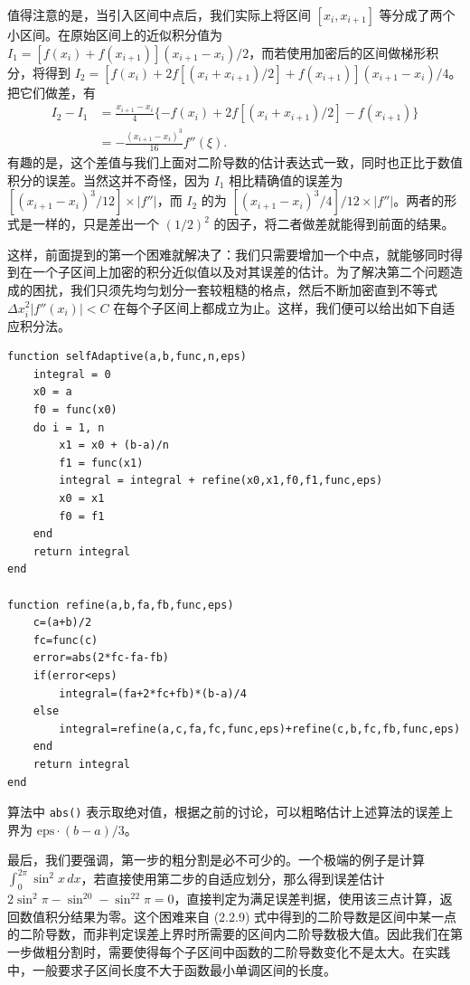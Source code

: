 值得注意的是，当引入区间中点后，我们实际上将区间 $[x_i,x_{i+1}]$ 等分成了两个小区间。在原始区间上的近似积分值为 $I_1=[f(x_i)+f(x_{i+1})](x_{i+1}-x_i)/2$，而若使用加密后的区间做梯形积分，将得到 $I_2=[f(x_i)+2f[(x_i+x_{i+1})/2]+f(x_{i+1})](x_{i+1}-x_i)/4$。把它们做差，有
\begin{equation}
\begin{aligned}
I_2-I_1&=\frac{x_{i+1}-x_i}{4}\{-f(x_i)+2f[(x_i+x_{i+1})/2]-f(x_{i+1})\}\\
&=-\frac{(x_{i+1}-x_i)^3}{16}f''(\xi).
\end{aligned}
\tag{2.2.9}
\end{equation}
有趣的是，这个差值与我们上面对二阶导数的估计表达式一致，同时也正比于数值积分的误差。当然这并不奇怪，因为 $I_1$ 相比精确值的误差为 $[(x_{i+1}-x_i)^3/12]\times |f''|$，而 $I_2$ 的为 $[(x_{i+1}-x_i)^3/4]/12\times|f''|$。两者的形式是一样的，只是差出一个 $(1/2)^2$ 的因子，将二者做差就能得到前面的结果。

这样，前面提到的第一个困难就解决了：我们只需要增加一个中点，就能够同时得到在一个子区间上加密的积分近似值以及对其误差的估计。为了解决第二个问题造成的困扰，我们只须先均匀划分一套较粗糙的格点，然后不断加密直到不等式 $\Delta x_i^2|f''(x_i)|<C$ 在每个子区间上都成立为止。这样，我们便可以给出如下自适应积分法。

\begin{algorithmBox}
\begin{lstlisting}[style=bellacode]
function selfAdaptive(a,b,func,n,eps)
    integral = 0
    x0 = a
    f0 = func(x0)
    do i = 1, n
        x1 = x0 + (b-a)/n
        f1 = func(x1)
        integral = integral + refine(x0,x1,f0,f1,func,eps)
        x0 = x1
        f0 = f1
    end
    return integral
end

function refine(a,b,fa,fb,func,eps)
    c=(a+b)/2
    fc=func(c)
    error=abs(2*fc-fa-fb)
    if(error<eps)
        integral=(fa+2*fc+fb)*(b-a)/4
    else
        integral=refine(a,c,fa,fc,func,eps)+refine(c,b,fc,fb,func,eps)
    end
    return integral
end
\end{lstlisting}
\end{algorithmBox}

算法中 \texttt{abs()} 表示取绝对值，根据之前的讨论，可以粗略估计上述算法的误差上界为 $\mathrm{eps}\cdot(b-a)/3$。

最后，我们要强调，第一步的粗分割是必不可少的。一个极端的例子是计算 $\int_0^{2\pi}\sin^2x\,dx$，若直接使用第二步的自适应划分，那么得到误差估计 $2\sin^2\pi-\sin^20-\sin^22\pi=0$，直接判定为满足误差判据，使用该三点计算，返回数值积分结果为零。这个困难来自 (2.2.9) 式中得到的二阶导数是区间中某一点的二阶导数，而非判定误差上界时所需要的区间内二阶导数极大值。因此我们在第一步做粗分割时，需要使得每个子区间中函数的二阶导数变化不是太大。在实践中，一般要求子区间长度不大于函数最小单调区间的长度。

